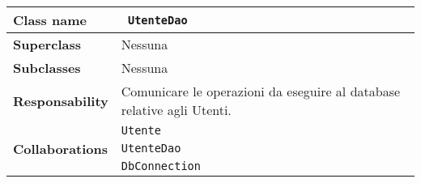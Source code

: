 \begin{table}[h!]
	\begin{tabular}{|l|l|}
		\hline 
		\textbf{Class name} &\texttt{ UtenteDao}
		\\ \hline
		\textbf{Superclass} & Nessuna
		\\ \hline
		\multirow{1}{*}{\textbf{Subclasses}} & Nessuna
		\\ \hline
		\textbf{Responsability} & Comunicare le operazioni da eseguire al database relative agli Utenti.
		\\ \hline
		\multirow{3}{*}{\textbf{Collaborations}} & \texttt{Utente} \\ 
		& \texttt{UtenteDao} \\
		& \texttt{DbConnection} \\ \hline
	\end{tabular}
\end{table}

\clearpage
\pagebreak


